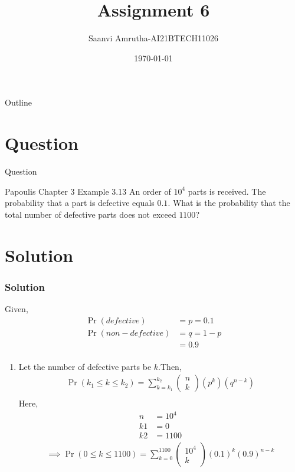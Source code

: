 \documentclass{beamer}
\title{Assignment 6}
\author{Saanvi Amrutha-AI21BTECH11026}
\date{\today}
\newcommand{\myvec}[1]{\ensuremath{\begin{pmatrix}#1\end{pmatrix}}}
\providecommand{\pr}[1]{\ensuremath{\Pr\left(#1\right)}}
\providecommand{\brak}[1]{\ensuremath{\left(#1\right)}}
\begin{document}
\begin{frame}
    \titlepage 
\end{frame}

\logo{}

\begin{frame}{Outline}
    \tableofcontents
\end{frame}

\section{Question}
\begin{frame}{Question}
    \begin{block}{Papoulis Chapter 3 Example 3.13}
       An order of $10^4$ parts is received. The probability that a part is defective equals $0.1$. What is the probability that the total number of defective parts does not exceed $1100$?
    \end{block}
\end{frame}

\section{Solution}
\begin{frame}
\frametitle{Solution}
Given, 
\begin{align}
\pr{defective}&=p=0.1\\
\pr{non-defective}&=q=1-p\\
&=0.9\\
\end{align}
\end{frame}
\begin{frame}
 \begin{enumerate}
     \item Let the number of defective parts be $k$.Then,\\
     \begin{align}
         \pr{k_1\leq k\leq k_2}=\sum_{k=k_1}^{k_2}\myvec{n\\k}\brak{p^k}\brak{q^{n-k}}\\
     \end{align}
     Here,
     \begin{align}
     n&=10^{4}\\
     k1&=0\\
     k2&=1100
     \end{align} 
     \begin{align}
      \implies\pr{0\leq k\leq 1100}=\sum_{k=0}^{1100}\myvec{10^4\\k}\brak{0.1}^k\brak{0.9}^{n-k}  
     \end{align}
 \end{enumerate}   
\end{frame}
\end{document}
